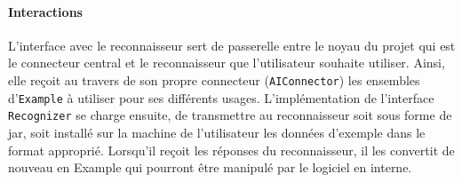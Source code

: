 \paragraph{Interactions}
L'interface avec le reconnaisseur sert de passerelle entre le noyau du projet qui est le connecteur central et le reconnaisseur que l'utilisateur souhaite utiliser. Ainsi, elle reçoit au travers de son propre connecteur (\texttt{AIConnector}) les ensembles d'\texttt{Example} à utiliser pour ses différents usages. L'implémentation de l'interface \texttt{Recognizer} se charge ensuite, de transmettre au reconnaisseur soit sous forme de jar, soit installé sur la machine de l'utilisateur les données d'exemple dans le format approprié. Lorsqu'il reçoit les réponses du reconnaisseur, il les convertit de nouveau en Example qui pourront être manipulé par le logiciel en interne.

